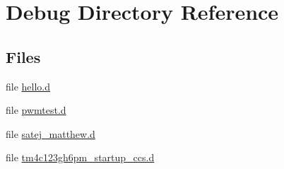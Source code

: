 \section{Debug Directory Reference}
\label{dir_faa8bedbcbaa373d57b77d9219afda20}
\subsection*{Files}
\begin{DoxyCompactItemize}
\item 
file \mbox{\hyperlink{hello_8d}{hello.\+d}}
\item 
file \mbox{\hyperlink{pwmtest_8d}{pwmtest.\+d}}
\item 
file \mbox{\hyperlink{satej__matthew_8d}{satej\+\_\+matthew.\+d}}
\item 
file \mbox{\hyperlink{tm4c123gh6pm__startup__ccs_8d}{tm4c123gh6pm\+\_\+startup\+\_\+ccs.\+d}}
\end{DoxyCompactItemize}
